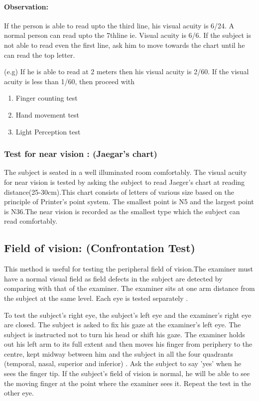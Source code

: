 \documentclass[a4paper,12pt]{book}
\begin{document}
		\paragraph{Observation:}
		If the person is able to read upto the third line, his visual acuity is 6/24. A normal person can read upto the 7thline ie. Visual acuity is 6/6. If the subject is not able to read even the first line, ask him to move towards the chart until he can read the top letter.
		\par
		(e.g) If he is able to read at 2 meters then his visual acuity is 2/60. If the visual acuity is less than 1/60, then proceed with
		\begin{enumerate}
\item{Finger counting test}
\item{Hand movement test}
\item{Light Perception test}
		\end{enumerate}

		\subsubsection*{Test for near vision : (Jaegar’s chart)}
			The subject is seated in a well illuminated room comfortably. The visual acuity for near vision is tested by asking the subject to read Jaeger's chart at reading distance(25-30cm).This chart consists of letters of various size based on the principle of  Printer’s point system. The smallest point is N5 and the largest point is N36.The near vision is recorded as the smallest type which the subject can read comfortably.
			\subsection*{Field of vision: (Confrontation Test)}
			This method is useful for testing the peripheral field of vision.The examiner must have a normal visual field as field defects in the subject are detected by comparing with that of the examiner. The examiner sits at one arm distance from the subject at the same level. Each eye is tested separately .
			\par
			To test the subject's right eye, the subject’s left eye and the examiner's right eye are closed. The subject is asked to fix his gaze at the examiner’s left eye. The subject is instructed not to turn his head or shift his gaze. The examiner holds out his left arm to its full extent and then moves his finger from periphery to the centre, kept midway between him and the subject in all the four quadrants (temporal, nasal, superior and inferior) . Ask the subject to say 'yes' when he sees the finger tip. If the subject's field of vision is normal, he will be able to see the moving finger at the point where the examiner sees it. Repeat the test in the other eye.
\end{document}
